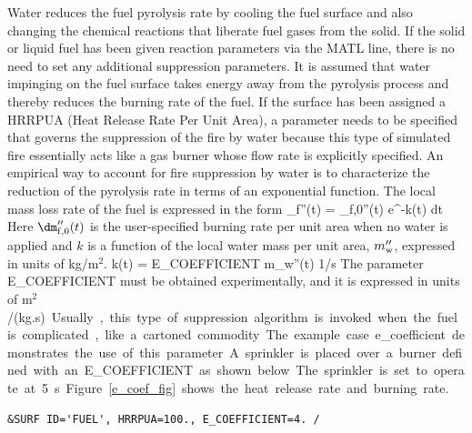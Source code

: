 \documentclass[11pt]{book}
\begin{document}
Water reduces the fuel pyrolysis rate by cooling the fuel surface and also changing the chemical reactions that liberate fuel gases from the solid. If the solid or liquid fuel has been given reaction parameters via the {\ct MATL} line, there is no need to set any additional suppression parameters. It is assumed that water impinging on the fuel surface takes energy away from the pyrolysis process and thereby reduces the burning rate of the fuel. If the surface has been assigned a {\ct HRRPUA} (Heat Release Rate Per Unit Area), a parameter needs to be specified that governs the suppression of the fire by water because this type of simulated fire essentially acts like a gas burner whose flow rate is explicitly specified. An empirical way to account for fire suppression by water is to characterize the reduction of the pyrolysis rate in terms of an exponential function. The local mass loss rate of the fuel is expressed in the form
\be
   \dm_{\rm f}''(t) = \dm_{\rm f,0}''(t) \; {\rm e}^{-\int k(t) \; dt} \label{nistexting}
\ee
Here $\dm_{\rm f,0}''(t)$ is the user-specified burning rate per unit area when no water is applied and $k$ is a function of the local water mass per unit area, $m_{\rm w}''$, expressed in units of kg/m$^2$.
\be
k(t) = \hbox{\ct E\_COEFFICIENT} \; m_{\rm w}''(t) \quad          \si{1/s}
\ee
The parameter {\ct E\_COEFFICIENT} must be obtained experimentally, and it is expressed in units of \si{m$^2$/(kg.s)}. Usually, this type of suppression algorithm is invoked when the fuel is complicated, like a cartoned commodity.  The example case {\ct e\_coefficient} demonstrates the use of this parameter.  A sprinkler is placed over a burner defined with an {\ct E\_COEFFICIENT} as shown below.  The sprinkler is set to operate at 5~s.  Figure~\ref{e_coef_fig} shows the heat release rate and burning rate.
\begin{lstlisting}
&SURF ID='FUEL', HRRPUA=100., E_COEFFICIENT=4. /
\end{lstlisting}
\end{document}
